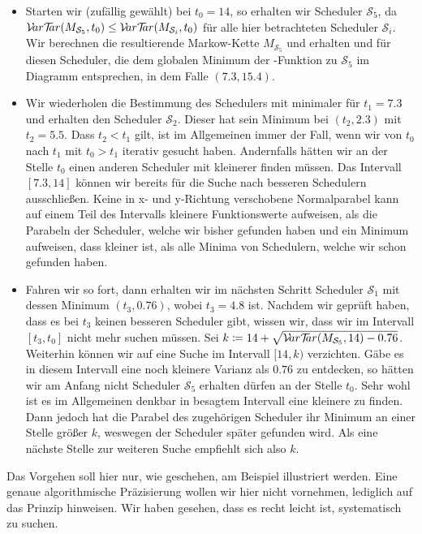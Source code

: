 \documentclass[a4paper]{article}
\newcommand{\mc}{Markow-Kette}
\theoremstyle{nonumberplain}
\begin{document}
\begin{itemize}
	\item Starten wir (zufällig gewählt) bei $t_0=14$, so erhalten wir Scheduler $\mathcal{S}_5$, da $\mathcal{V}\!ar \mathcal{T}\!\!ar(M_{\mathcal{S}_5},t_0) \leq \mathcal{V}\!ar \mathcal{T}\!\!ar(M_{\mathcal{S}_i},t_0)$ für alle hier betrachteten Scheduler $\mathcal{S}_i$. Wir berechnen die resultierende \mc{} $M_{\mathcal{S}_5}$ und erhalten \var{} und \expect{} für diesen Scheduler, die dem globalen Minimum der \vt{}-Funktion zu $\mathcal{S}_5$ im Diagramm entsprechen, in dem Falle $(7.3,15.4)$.
	\item Wir wiederholen die Bestimmung des Schedulers mit minimaler \vt{} für $t_1=7.3$ und erhalten den Scheduler $\mathcal{S}_2$. Dieser hat sein Minimum bei $(t_2,2.3)$ mit $t_2 = 5.5$. Dass $t_2 < t_1$ gilt, ist im Allgemeinen immer der Fall, wenn wir von $t_0$ nach $t_1$ mit $t_0 > t_1$ iterativ gesucht haben. Andernfalls hätten wir an der Stelle $t_0$ einen anderen Scheduler mit kleinerer \vt{} finden müssen. Das Intervall $[7.3 , 14]$ können wir bereits für die Suche nach besseren Schedulern ausschließen. Keine in x- und y-Richtung verschobene Normalparabel kann auf einem Teil des Intervalls kleinere Funktionswerte aufweisen, als die Parabeln der Scheduler, welche wir bisher gefunden haben und ein Minimum aufweisen, dass kleiner ist, als alle Minima von Schedulern, welche wir schon gefunden haben. %
	\item Fahren wir so fort, dann erhalten wir im nächsten Schritt Scheduler $\mathcal{S}_1$ mit dessen Minimum $(t_3,0.76)$, wobei $t_3 = 4.8$ ist. Nachdem wir geprüft haben, dass es bei $t_3$ keinen besseren Scheduler gibt, wissen wir, dass wir im Intervall $[t_3,t_0]$ nicht mehr suchen müssen. Sei $k \coloneqq 14 + \sqrt{\mathcal{V}\!ar \mathcal{T}\!\!ar(M_{\mathcal{S}_5},14)-0.76}$. Weiterhin können wir auf eine Suche im Intervall $[14, k)$ verzichten. Gäbe es in diesem Intervall eine noch kleinere Varianz als $0.76$ zu entdecken, so hätten wir am Anfang nicht Scheduler $\mathcal{S}_5$ erhalten dürfen an der Stelle $t_0$. Sehr wohl ist es im Allgemeinen denkbar in besagtem Intervall eine kleinere \vt{} zu finden. Dann jedoch hat die Parabel des zugehörigen Scheduler ihr Minimum an einer Stelle größer $k$, weswegen der Scheduler später gefunden wird. Als eine nächste Stelle zur weiteren Suche empfiehlt sich also $k$.
\end{itemize} 

Das Vorgehen soll hier nur, wie geschehen, am Beispiel illustriert werden. Eine genaue algorithmische Präzisierung wollen wir hier nicht vornehmen, lediglich auf das Prinzip hinweisen. Wir haben gesehen, dass es recht leicht ist, systematisch zu suchen.
\end{document}
